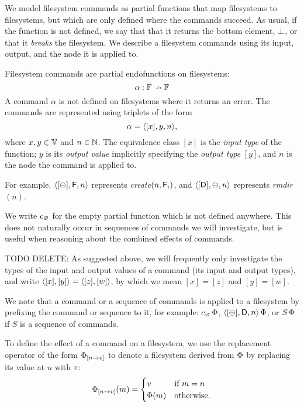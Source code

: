 
We model filesystem commands as partial functions 
that map filesystems to filesystems, but which
are only defined where the commands succeed.
As usual, if the function is not defined, we say that that it returns the bottom element, $\bot$,
or that it \emph{breaks} the filesystem.
We describe a filesystem commands using its input, output, and
the node it is applied to.

\begin{mydef}
Filesystem commands are partial endofunctions on filesystems:
\[ \alpha: \mathbb{F} \nrightarrow \mathbb{F} \]
A command $\alpha$ is not defined on filesystems where it returns an error.
The commands are represented using triplets of the form
\[ \alpha = \langle{[x],y,n}\rangle, \]
where $x,y\in\mathbb{V}$ and $n\in\mathbb{N}$.
The equivalence class $[x]$ is the \emph{input type} of the function;
$y$ is its \emph{output value} implicitly specifying the \emph{output type} $[y]$,
and $n$ is the node the command is applied to.
\end{mydef}
For example, $\langle{[\ominus],\mathsf{F},n}\rangle$ represents \textit{create}$(n,\mathsf{F}_i)$,
and $\langle{[\mathsf{D}],\ominus,n}\rangle$ represents \textit{rmdir}$(n)$.

We write $c_\varnothing$ for the empty partial function which is not defined anywhere.
This does not naturally occur in sequences of commands we will investigate,
but is useful when reasoning about the combined effects of commands.


TODO DELETE:
As suggested above, we will frequently only investigate
the types of the input and output values of a command
(its input and output types), and write
$\langle{[x],[y]}\rangle=\langle{[z],[w]}\rangle$, by which we mean $[x]=[z]$ and $[y]=[w]$.

We note that a command or a sequence of commands is applied to a filesystem
by prefixing the command or sequence to it, for example: $c_\varnothing\,\Phi$, $\langle{[\ominus],\mathsf{D},n}\rangle\,\Phi$, 
or $S\,\Phi$ if $S$ is a sequence of commands.

To define the effect of a command on a filesystem, we use
the replacement operator of the form
${\Phi}_{[{n}\rightarrow{v}]}$ to denote a filesystem derived from $\Phi$ 
by replacing its value at $n$ with $v$:
\[ {\Phi}_{[{n}\rightarrow{v}]}(m) =
   \begin{cases}
   v &\textrm{if~} m=n\\
   \Phi(m) &\textrm{otherwise.}
   \end{cases}
\]

